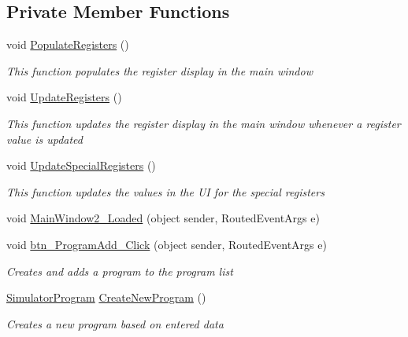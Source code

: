 \subsection*{Private Member Functions}
\begin{DoxyCompactItemize}
\item 
void \hyperlink{class_c_p_u___o_s___simulator_1_1_main_window_a06b2ba04e8c006037cae7b0e40b9c5a0}{Populate\+Registers} ()
\begin{DoxyCompactList}\small\item\em This function populates the register display in the main window \end{DoxyCompactList}\item 
void \hyperlink{class_c_p_u___o_s___simulator_1_1_main_window_a4fbca2d50698a847da4ab82c3f380680}{Update\+Registers} ()
\begin{DoxyCompactList}\small\item\em This function updates the register display in the main window whenever a register value is updated \end{DoxyCompactList}\item 
void \hyperlink{class_c_p_u___o_s___simulator_1_1_main_window_a798838ad3fae6117c8e624047a591931}{Update\+Special\+Registers} ()
\begin{DoxyCompactList}\small\item\em This function updates the values in the U\+I for the special registers \end{DoxyCompactList}\item 
void \hyperlink{class_c_p_u___o_s___simulator_1_1_main_window_a3b945b691332686989cd5b5107f7f98b}{Main\+Window2\+\_\+\+Loaded} (object sender, Routed\+Event\+Args e)
\item 
void \hyperlink{class_c_p_u___o_s___simulator_1_1_main_window_abe3e79941789134ce080390fcafc720e}{btn\+\_\+\+Program\+Add\+\_\+\+Click} (object sender, Routed\+Event\+Args e)
\begin{DoxyCompactList}\small\item\em Creates and adds a program to the program list \end{DoxyCompactList}\item 
\hyperlink{class_c_p_u___o_s___simulator_1_1_c_p_u_1_1_simulator_program}{Simulator\+Program} \hyperlink{class_c_p_u___o_s___simulator_1_1_main_window_a4cb75cfa224757b1dc708b60681ad803}{Create\+New\+Program} ()
\begin{DoxyCompactList}\small\item\em Creates a new program based on entered data \end{DoxyCompactList}\item 

\end{DoxyCompactItemize}
